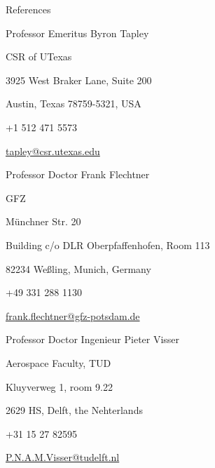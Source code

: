 
\begin{cvtext}{References}

\begin{ittj}
  \item Professor Emeritus Byron Tapley 
  \item \acl{CSR} of \acl{UTexas}
  \item 3925 West Braker Lane, Suite 200
  \item Austin, Texas 78759-5321, \ac{USA}
  \item +1 512 471 5573
  \item \href{mailto:tapley@csr.utexas.edu}{tapley@csr.utexas.edu}
\end{ittj}

\begin{ittj}
  \item Professor Doctor Frank Flechtner
  \item \acl{GFZ}
  \item Münchner Str. 20
  \item Building c/o DLR Oberpfaffenhofen, Room 113
  \item 82234 Weßling, Munich, Germany
  \item +49 331 288 1130
  \item \href{mailto:frank.flechtner@gfz-potsdam.de}{frank.flechtner@gfz-potsdam.de}
\end{ittj}

\begin{ittj}
  \item Professor Doctor Ingenieur Pieter Visser
  \item Aerospace Faculty, \acl{TUD}
  \item Kluyverweg 1, room 9.22
  \item 2629 HS, Delft, the Nehterlands
  \item +31 15 27 82595
  \item \href{mailto:P.N.A.M.Visser@tudelft.nl}{P.N.A.M.Visser@tudelft.nl}
\end{ittj}



\end{cvtext}